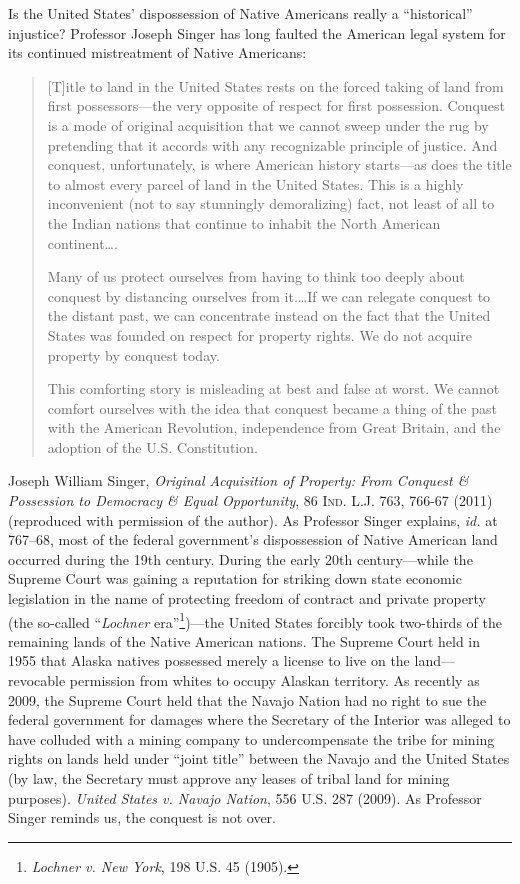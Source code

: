 Is the United States' dispossession of Native Americans really a
``historical'' injustice? Professor Joseph Singer has long faulted the American
legal system for its continued mistreatment of Native Americans:
\begin{quotation}
[T]itle to land in the United States rests on the forced taking of land from
first possessors---the very opposite of respect for first possession. Conquest
is a mode of original acquisition that we cannot sweep under the rug by
pretending that it accords with any recognizable principle of justice. And
conquest, unfortunately, is where American history starts---as does the title to
almost every parcel of land in the United States. This is a highly inconvenient
(not to say stunningly demoralizing) fact, not least of all to the Indian
nations that continue to inhabit the North American continent\ldots .

Many of us protect ourselves from having to think too deeply about conquest by
distancing ourselves from it.\ldots If we can relegate conquest to the distant
past, we can concentrate instead on the fact that the United States was founded
on respect for property rights. We do not acquire property by conquest today.

This comforting story is misleading at best and false at worst. We cannot
comfort ourselves with the idea that conquest became a thing of the past with
the American Revolution, independence from Great Britain, and the adoption of
the U.S. Constitution.
\end{quotation}
Joseph William Singer, \textit{Original Acquisition of Property: From Conquest
\& Possession to Democracy \& Equal Opportunity}, 86 \textsc{Ind. L.J.} 763,
766-67 (2011) (reproduced with permission of the author). As Professor Singer
explains, \textit{id.} at 767--68, most of the federal government's
dispossession
of Native American land occurred during the 19th century. During the early 20th
century---while the Supreme Court was gaining a reputation for striking down
state economic legislation in the name of protecting freedom of contract and
private property (the so-called ``\textit{Lochner} era''\footnote{\emph{Lochner
v. New York}, 198 U.S. 45 (1905).})---the United States forcibly took
two-thirds of the remaining lands of the Native American nations. The Supreme
Court held
in 1955 that Alaska natives possessed merely a license to live on the
land---revocable permission from whites to occupy Alaskan territory. As recently
as 2009, the Supreme Court held that the Navajo Nation had no right to sue the
federal government for damages where the Secretary of the Interior was alleged
to have colluded with a mining company to undercompensate the tribe for mining
rights on lands held under ``joint title'' between the Navajo and the United
States (by law, the Secretary must approve any leases of tribal land for mining
purposes). \textit{United States v. Navajo Nation}, 556 U.S. 287 (2009). As
Professor Singer reminds us, the conquest is not over.

